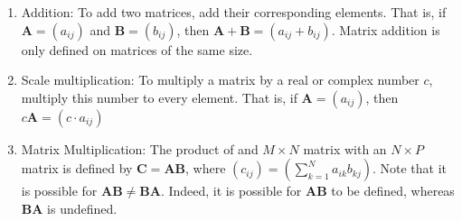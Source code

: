 \documentclass[crop=false,class=article,oneside]{standalone}
\begin{document}
        \begin{enumerate}
            \item Addition: To add two matrices, add their
                corresponding elements. That is, if
                $\mathbf{A}=(a_{ij})$ and $\mathbf{B}=(b_{ij})$,
                then $\mathbf{A}+\mathbf{B}=(a_{ij}+b_{ij})$.
                Matrix addition is only defined on matrices of
                the same size.
            \item Scale multiplication: To multiply a
                matrix by a real or complex number $c$,
                multiply this number to every element. That is,
                if $\mathbf{A}=(a_{ij})$, then
                $c\mathbf{A}=({c}\cdot{a_{ij}})$
            \item Matrix Multiplication: The product of
                and ${M}\times{N}$ matrix with an
                ${N}\times{P}$ matrix is defined by
                $\mathbf{C}=\mathbf{A}\mathbf{B}$, where
                $(c_{ij})=(\sum_{k=1}^{N}a_{ik}b_{kj})$. Note
                that it is possible for
                $\mathbf{A}\mathbf{B}\ne\mathbf{B}\mathbf{A}$.
                Indeed, it is possible for
                $\mathbf{A}\mathbf{B}$ to be defined, whereas
                $\mathbf{B}\mathbf{A}$ is undefined.
        \end{enumerate}
\end{document}
